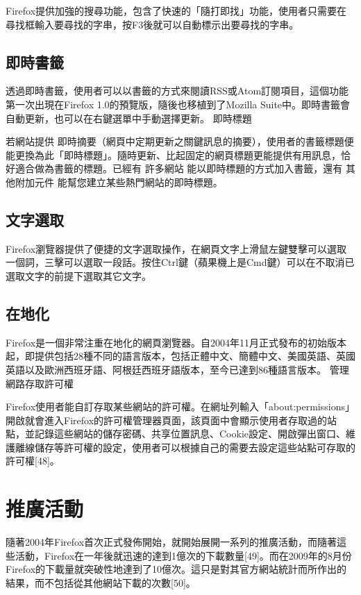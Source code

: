 \documentclass[12pt]{article}
\begin{document}
Firefox提供加強的搜尋功能，包含了快速的「隨打即找」功能，使用者只需要在尋找框輸入要尋找的字串，按F3後就可以自動標示出要尋找的字串。
\subsection{即時書籤}

透過即時書籤，使用者可以以書籤的方式來閱讀RSS或Atom訂閱項目，這個功能第一次出現在Firefox 1.0的預覽版，隨後也移植到了Mozilla Suite中。即時書籤會自動更新，也可以在右鍵選單中手動選擇更新。
即時標題

若網站提供 即時摘要（網頁中定期更新之關鍵訊息的摘要），使用者的書籤標題便能更換為此「即時標題」。隨時更新、比起固定的網頁標題更能提供有用訊息，恰好適合做為書籤的標題。已經有 許多網站 能以即時標題的方式加入書籤，還有 其他附加元件 能幫您建立某些熱門網站的即時標題。

\subsection{文字選取}

Firefox瀏覽器提供了便捷的文字選取操作，在網頁文字上滑鼠左鍵雙擊可以選取一個詞，三擊可以選取一段話。按住Ctrl鍵（蘋果機上是Cmd鍵）可以在不取消已選取文字的前提下選取其它文字。

\subsection{在地化}

Firefox是一個非常注重在地化的網頁瀏覽器。自2004年11月正式發布的初始版本起，即提供包括28種不同的語言版本，包括正體中文、簡體中文、美國英語、英國英語以及歐洲西班牙語、阿根廷西班牙語版本，至今已達到86種語言版本。
管理網路存取許可權

Firefox使用者能自訂存取某些網站的許可權。在網址列輸入「about:\allowbreak{}permissions」開啟就會進入Firefox的許可權管理器頁面，該頁面中會顯示使用者存取過的站點，並記錄這些網站的儲存密碼、共享位置訊息、Cookie設定、開啟彈出窗口、維護離線儲存等許可權的設定，使用者可以根據自己的需要去設定這些站點可存取的許可權[48]。

\section{推廣活動}

隨著2004年Firefox首次正式發佈開始，就開始展開一系列的推廣活動，而隨著這些活動，Firefox在一年後就迅速的達到1億次的下載數量[49]。而在2009年的8月份Firefox的下載量就突破性地達到了10億次。這只是對其官方網站統計而所作出的結果，而不包括從其他網站下載的次數[50]。
\end{document}
